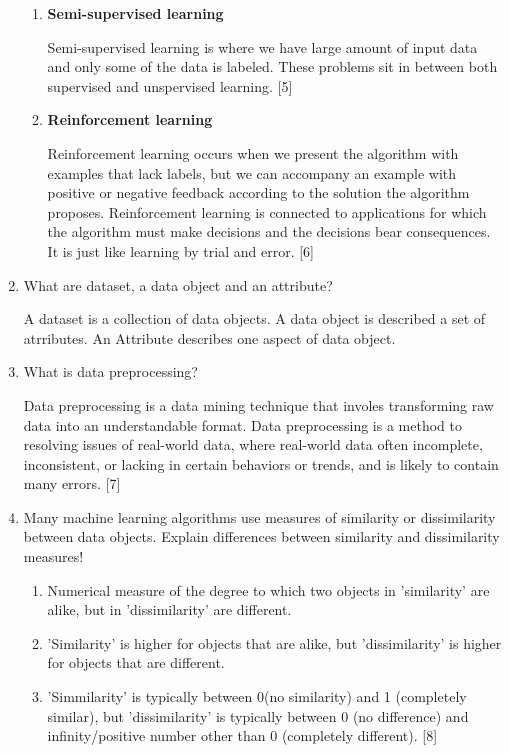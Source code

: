 \documentclass[12pt]{article}%
\begin{document}
\begin{enumerate}
\begin{enumerate}
		\item \textbf{Semi-supervised learning}
		\par Semi-supervised learning is where we have large amount of input data and only some of the data is labeled. These problems sit in between both supervised and unspervised learning. [5]

		\item \textbf{Reinforcement learning}
		\par Reinforcement learning occurs when we present the algorithm with examples that lack labels, but we can accompany an example with positive or negative feedback according to the solution the algorithm proposes. Reinforcement learning is connected to applications for which the algorithm must make decisions and the decisions bear consequences. It is just like learning by trial and error. [6]
	\end{enumerate}

	\item What are dataset, a data object and an attribute?
	\par A dataset is a collection of data objects. A data object is described a set of atrributes. An Attribute describes one aspect of data object.

	\item What is data preprocessing?
	\par Data preprocessing is a data mining technique that involes transforming raw data into an understandable format. Data preprocessing is a method to resolving issues of real-world data, where real-world data often incomplete, inconsistent, or lacking in certain behaviors or trends, and is likely to contain many errors. [7]

	\item Many machine learning algorithms use measures of similarity or dissimilarity between data objects. Explain differences between similarity and dissimilarity measures!
	\begin{enumerate}
		\item Numerical measure of the degree to which two objects in 'similarity' are alike, but in 'dissimilarity' are different.
		\item 'Similarity' is higher for objects that are alike, but 'dissimilarity' is higher for objects that are different.
		\item 'Simmilarity' is typically between 0(no similarity) and 1 (completely similar), but 'dissimilarity' is typically between 0 (no difference) and infinity/positive number other than 0 (completely different). [8]
	\end{enumerate}


\end{enumerate}
\end{document}
